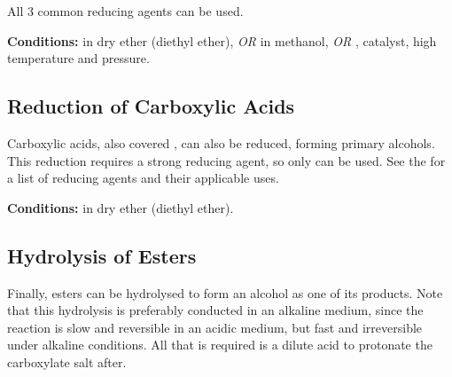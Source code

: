 			All 3 common reducing agents can be used.

			\vspace{1.5em}
			\vbox{\textbf{Conditions:}	\tabto{35mm} in dry ether (diethyl ether), \textit{OR}
  										\tabto{35mm} in methanol, \textit{OR}
  										\tabto{35mm},  catalyst, high temperature and pressure.}






		\pagebreak
		\subsection{Reduction of Carboxylic Acids}

			Carboxylic acids, also covered \hyperlink{ChapterCarboxylicAcids}{}, can also be reduced, forming primary alcohols.
			This reduction requires a strong reducing agent, so only  can be used. See the
			\hyperlink{AppendixReducingAgents}{} for a list of reducing agents and their applicable uses.

			\vspace{1.5em}
			\vbox{\textbf{Conditions:}\tabto{35mm} in dry ether (diethyl ether).}




		\subsection{Hydrolysis of Esters}

			Finally, esters can be hydrolysed to form an alcohol as one of its products. Note that this hydrolysis is preferably conducted
			in an alkaline medium, since the reaction is slow and reversible in an acidic medium, but fast and irreversible under
			alkaline conditions. All that is required is a dilute acid to protonate the carboxylate salt after.


